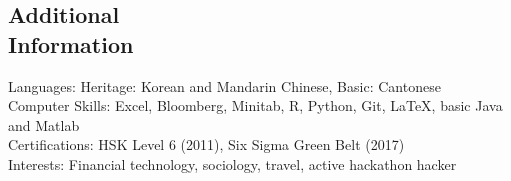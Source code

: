 \documentclass[resmargin]{res}
\begin{document}
\begin{resume}
\section{Additional \\ Information}
    Languages: Heritage: Korean and Mandarin Chinese, Basic: Cantonese \\
    Computer Skills: Excel, Bloomberg, Minitab, R, Python, Git, \LaTeX, basic Java and Matlab \\
    Certifications: HSK Level 6 (2011), Six Sigma Green Belt (2017) \\
    Interests: Financial technology, sociology, travel, active hackathon hacker \\


\end{resume} 
\end{document}
